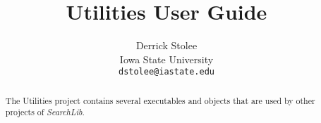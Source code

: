 \documentclass[11pt]{article}
\title{Utilities User Guide}
\author{Derrick Stolee \\ 
	Iowa State University\\ 
	\texttt{dstolee@iastate.edu}
       }
\def\SearchLib{{\it SearchLib}}
\begin{document}
\maketitle
\vspace{-.3in}
\begin{abstract}
	The Utilities project contains several executables and objects that are used by other projects of \SearchLib.
\end{abstract}

%
%
%
%
%
%
%
%
%
%
%
%
%
%
%
%
\end{document}
